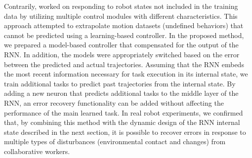 Contrarily, \cite{Suzuki2021ral} worked on responding to robot states not included in the training data by utilizing multiple control modules with different characteristics. This approach attempted to extrapolate motion datasets (undefined behaviors) that cannot be predicted using a learning-based controller. In the proposed method, we prepared a model-based controller that compensated for the output of the RNN. In addition, the models were appropriately switched based on the error between the predicted and actual trajectories. Assuming that the RNN embeds the most recent information necessary for task execution in its internal state, we train additional tasks to predict past trajectories from the internal state. By adding a new neuron that predicts additional tasks to the middle layer of the RNN, an error recovery functionality can be added without affecting the performance of the main learned task. In real robot experiments, we confirmed that, by combining this method with the dynamic design of the RNN internal state described in the next section, it is possible to recover errors in response to multiple types of disturbances (environmental contact and changes) from collaborative workers.


